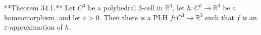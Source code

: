 **Theorem 34.1.** Let $C^3$ be a polyhedral 3-cell in $\mathbb{R}^3$, let $h: C^3 \to \mathbb{R}^3$ be a homeomorphism, and let $\varepsilon > 0$. Then there is a PLH $f: C^3 \to \mathbb{R}^3$ such that $f$ is an $\varepsilon$-approximation of $h$.
